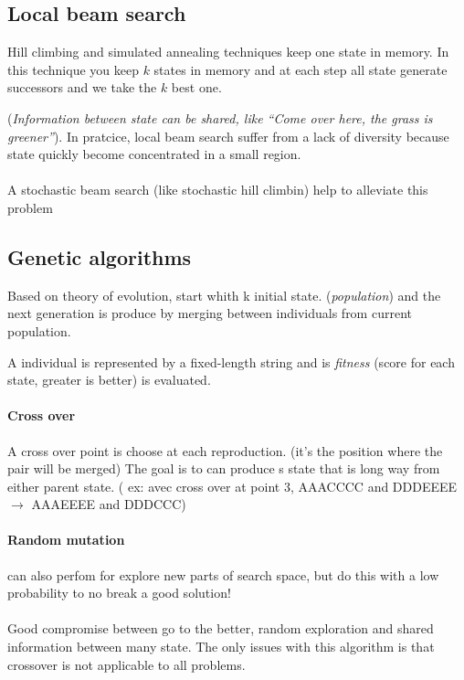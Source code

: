 \subsection{Local beam search}

Hill climbing and simulated annealing techniques keep one state in memory. 
In this technique you keep $k$ states in memory and at each step all state 
generate successors and we take the $k$ best one.

(\textit{Information between state can be shared, like
``Come over here, the grass is greener''}).
In pratcice, local beam search suffer from a lack of diversity because
state quickly become concentrated in a small region.


\paragraph{ } A stochastic beam search (like stochastic hill climbin)
help to alleviate this problem


\subsection{Genetic algorithms}  

Based on theory  of  evolution, start  whith  k initial  state.
(\textit{population})  and the  next  generation is  produce by  merging
between individuals from current population. 

A individual is represented by a fixed-length string and is \textit{fitness}
(score for each state, greater is better) is evaluated.

\paragraph{Cross over} A cross over point is choose at each reproduction. (it's the position where
the pair will be merged)
The goal is to can produce s state that is long way from either parent state.
( ex: avec cross over at point 3, AAACCCC and DDDEEEE $\to$ AAAEEEE and DDDCCC)


\paragraph{Random mutation } can also perfom for explore new parts of
search space, but do this with a low probability to no break a good solution!


\paragraph{ } 
Good compromise between go to the better, random exploration and shared information
between many state.
The only issues with this algorithm is that crossover is not applicable to all problems.

